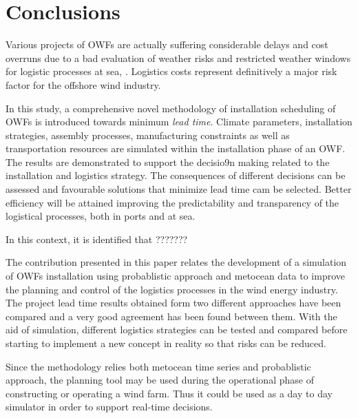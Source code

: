 \section{Conclusions}
\label{conclusions}
Various projects of OWFs are actually suffering considerable delays and cost overruns due to a bad evaluation of weather risks and restricted weather windows for logistic processes at sea, \cite{TCE12, ISOPE2013}. Logistics costs represent definitively a major risk factor for the offshore wind industry.

In this study, a comprehensive novel methodology of installation scheduling of OWFs is introduced towards minimum \textit{lead time}. Climate parameters, installation strategies, assembly processes, manufacturing constraints as well as transportation resources are simulated within the installation phase of an OWF. The results are demonstrated to support the decisio9n making related to the installation and logistics strategy. The consequences of different decisions can be assessed and favourable solutions that minimize lead time cam be selected. Better efficiency will be attained improving the predictability and transparency of the logistical processes, both in ports and at sea.

In this context, it is identified that ???????

The contribution presented in this paper relates the development of a simulation of OWFs installation using probablistic approach and metocean data to improve the planning and control of the logistics processes in the wind energy industry. The project lead time results obtained form two different approaches have been compared and a very good agreement has been found between them. With the aid of simulation, different logistics strategies can be tested and compared before starting to implement a new concept in reality so that risks can be reduced.

Since the methodology relies both metocean time series and probablistic approach, the planning tool may be used during the operational phase of constructing or operating a wind farm. Thus it could be used as a day to day simulator in order to support real-time decisions.
